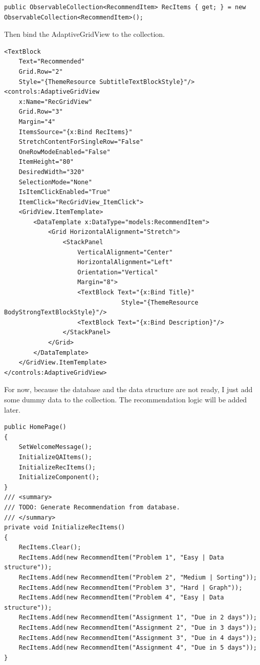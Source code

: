 \documentclass[a4paper]{report}
\begin{document}
\begin{verbatim}
public ObservableCollection<RecommendItem> RecItems { get; } = new ObservableCollection<RecommendItem>();
\end{verbatim}

Then bind the AdaptiveGridView to the collection.

\begin{verbatim}
<TextBlock 
    Text="Recommended"
    Grid.Row="2"
    Style="{ThemeResource SubtitleTextBlockStyle}"/>
<controls:AdaptiveGridView
    x:Name="RecGridView"
    Grid.Row="3"
    Margin="4"
    ItemsSource="{x:Bind RecItems}"
    StretchContentForSingleRow="False"
    OneRowModeEnabled="False"
    ItemHeight="80"
    DesiredWidth="320"
    SelectionMode="None"
    IsItemClickEnabled="True"
    ItemClick="RecGridView_ItemClick">
    <GridView.ItemTemplate>
        <DataTemplate x:DataType="models:RecommendItem">
            <Grid HorizontalAlignment="Stretch">
                <StackPanel 
                    VerticalAlignment="Center"
                    HorizontalAlignment="Left"
                    Orientation="Vertical"
                    Margin="8">
                    <TextBlock Text="{x:Bind Title}"
                                Style="{ThemeResource BodyStrongTextBlockStyle}"/>
                    <TextBlock Text="{x:Bind Description}"/>
                </StackPanel>
            </Grid>
        </DataTemplate>
    </GridView.ItemTemplate>
</controls:AdaptiveGridView>
\end{verbatim}

For now, because the database and the data structure are not ready, I just add some dummy data to the collection. The recommendation logic will be added later.

\begin{verbatim}
public HomePage()
{
    SetWelcomeMessage();
    InitializeQAItems();
    InitializeRecItems();
    InitializeComponent();
}
/// <summary>
/// TODO: Generate Recommendation from database.
/// </summary>
private void InitializeRecItems()
{
    RecItems.Clear();
    RecItems.Add(new RecommendItem("Problem 1", "Easy | Data structure"));
    RecItems.Add(new RecommendItem("Problem 2", "Medium | Sorting"));
    RecItems.Add(new RecommendItem("Problem 3", "Hard | Graph"));
    RecItems.Add(new RecommendItem("Problem 4", "Easy | Data structure"));
    RecItems.Add(new RecommendItem("Assignment 1", "Due in 2 days"));
    RecItems.Add(new RecommendItem("Assignment 2", "Due in 3 days"));
    RecItems.Add(new RecommendItem("Assignment 3", "Due in 4 days"));
    RecItems.Add(new RecommendItem("Assignment 4", "Due in 5 days"));
}
\end{verbatim}
\end{document}
